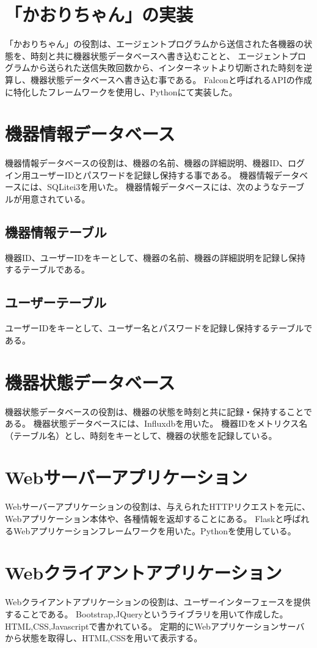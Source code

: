 \section{「かおりちゃん」の実装}
「かおりちゃん」の役割は、エージェントプログラムから送信された各機器の状態を、時刻と共に機器状態データベースへ書き込むことと、
エージェントプログラムから送られた送信失敗回数から、インターネットより切断された時刻を逆算し、機器状態データベースへ書き込む事である。
Falconと呼ばれるAPIの作成に特化したフレームワークを使用し、Pythonにて実装した。

\section{機器情報データベース}
機器情報データベースの役割は、機器の名前、機器の詳細説明、機器ID、ログイン用ユーザーIDとパスワードを記録し保持する事である。
機器情報データベースには、SQLitei3を用いた。
機器情報データベースには、次のようなテーブルが用意されている。
\subsection{機器情報テーブル}
機器ID、ユーザーIDをキーとして、機器の名前、機器の詳細説明を記録し保持するテーブルである。
\subsection{ユーザーテーブル}
ユーザーIDをキーとして、ユーザー名とパスワードを記録し保持するテーブルである。

\section{機器状態データベース}
機器状態データベースの役割は、機器の状態を時刻と共に記録・保持することである。
機器状態データベースには、Influxdbを用いた。
機器IDをメトリクス名（テーブル名）とし、時刻をキーとして、機器の状態を記録している。

\section{Webサーバーアプリケーション}
Webサーバーアプリケーションの役割は、与えられたHTTPリクエストを元に、Webアプリケーション本体や、各種情報を返却することにある。
Flaskと呼ばれるWebアプリケーションフレームワークを用いた。Pythonを使用している。

\section{Webクライアントアプリケーション}
Webクライアントアプリケーションの役割は、ユーザーインターフェースを提供することである。
Bootstrap,JQueryというライブラリを用いて作成した。HTML,CSS,Javascriptで書かれている。
定期的にWebアプリケーションサーバから状態を取得し、HTML,CSSを用いて表示する。






